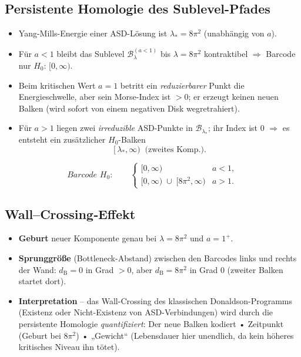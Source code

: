\documentclass[10pt, letterpaper]{article}
\begin{document}
\subsection{Persistente Homologie des Sublevel-Pfades}

\begin{itemize}
\item Yang-Mills-Energie einer ASD-Lösung ist \(\lambda_\ast=8\pi^2\) (unabhängig von \(a\)).
\item Für \(a<1\) bleibt das Sublevel
      \(\mathcal B_\lambda^{(a<1)}\)
      bis \(\lambda=8\pi^2\) kontraktibel $\Rightarrow$ Barcode nur \(H_0\!:\,[0,\infty)\).
\item Beim kritischen Wert \(a=1\) betritt ein \emph{reduzierbarer} Punkt die
      Energieschwelle, aber sein Morse-Index ist \(>0\);
      er erzeugt keinen neuen Balken (wird sofort von einem negativen Disk
      wegretrahiert).
\item Für \(a>1\) liegen zwei
      \emph{irre­duzible} ASD-Punkte in \(\mathcal B_{\lambda_\ast}\);
      ihr Index ist \(0\) $\Rightarrow$ es entsteht ein zusätzlicher
      \(H_0\)-Balken
      \[
        [\,\lambda_\ast,\infty)\ \text{ (zweites Komp.)}.
      \]
\end{itemize}

\[
\textit{Barcode }H_0:\qquad
\begin{cases}
  [0,\infty) & a<1,\\[2pt]
  [0,\infty)\;\cup\;[8\pi^2,\infty) & a>1 .
\end{cases}
\]

\subsection*{Wall--Crossing‐Effekt}

\begin{itemize}
\item \textbf{Geburt} neuer Komponente genau bei
      \(\lambda=8\pi^2\) und \(a=1^{+}\).
\item \textbf{Sprunggröße} (Bottleneck-Abstand) zwischen den
      Barcodes links und rechts der Wand:
      \(\displaystyle d_{\mathrm B}=0\) in Grad \(>0\),
      aber \(d_{\mathrm B}=8\pi^2\) in Grad 0
      (zweiter Balken startet dort).
\item \textbf{Interpretation} –
      das Wall-Crossing des klassischen Donaldson-Programms
      (Existenz oder Nicht-Existenz von ASD-Verbindungen)
      wird durch die persistente Homologie \emph{quantifiziert}:
      Der neue Balken kodiert • Zeitpunkt (Geburt bei \(8\pi^2\))  
      • „Gewicht“ (Lebensdauer hier unendlich, da kein höheres
        kritisches Niveau ihn tötet).
\end{itemize}
\end{document}
